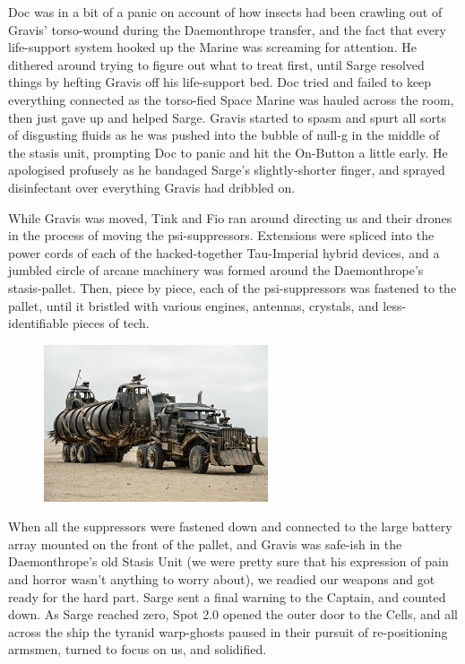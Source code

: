 Doc was in a bit of a panic on account of how insects had been crawling out of Gravis' torso-wound during the Daemonthrope transfer, and the fact that every life-support system hooked up the Marine was screaming for attention. 
He dithered around trying to figure out what to treat first, until Sarge resolved things by hefting Gravis off his life-support bed. 
Doc tried and failed to keep everything connected as the torso-fied Space Marine was hauled across the room, then just gave up and helped Sarge. 
Gravis started to spasm and spurt all sorts of disgusting fluids as he was pushed into the bubble of null-g in the middle of the stasis unit, prompting Doc to panic and hit the On-Button a little early. 
He apologised profusely as he bandaged Sarge's slightly-shorter finger, and sprayed disinfectant over everything Gravis had dribbled on.

While Gravis was moved, Tink and Fio ran around directing us and their drones in the process of moving the psi-suppressors. 
Extensions were spliced into the power cords of each of the hacked-together Tau-Imperial hybrid devices, and a jumbled circle of arcane machinery was formed around the Daemonthrope's stasis-pallet. 
Then, piece by piece, each of the psi-suppressors was fastened to the pallet, until it bristled with various engines, antennas, crystals, and less-identifiable pieces of tech.

\begin{figure}
	\begin{center}
		\includegraphics[width=\figwidth]{pics/15/48.png}
	\end{center}
\end{figure}
When all the suppressors were fastened down and connected to the large battery array mounted on the front of the pallet, and Gravis was safe-ish in the Daemonthrope's old Stasis Unit (we were pretty sure that his expression of pain and horror wasn't anything to worry about), we readied our weapons and got ready for the hard part. 
Sarge sent a final warning to the Captain, and counted down. 
As Sarge reached zero, Spot 2.0 opened the outer door to the Cells, and all across the ship the tyranid warp-ghosts paused in their pursuit of re-positioning armsmen, turned to focus on us, and solidified. 


